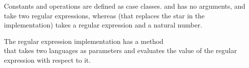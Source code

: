 Constants and operations are defined as case classes.  and  has no arguments,  and  take two regular expressions, whereas  (that replaces the star in the implementation) takes a regular expression and a natural number.

The regular expression implementation has a method \\  that takes two languages as parameters and evaluates the value of the regular expression with respect to it.
